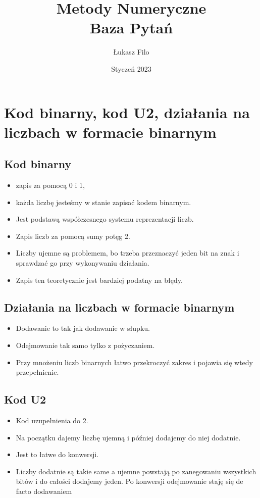 \documentclass[a4paper]{article}
\title{Metody Numeryczne \\ Baza Pytań}
\author{Łukasz Filo}
\date{Styczeń 2023}
\begin{document}
\maketitle
\renewcommand*\contentsname{Spis Treści}
\tableofcontents

\newpage

\section{Kod binarny, kod U2, działania na liczbach w formacie binarnym}

\subsection{Kod binarny}
\begin{itemize}
    \item zapis za pomocą 0 i 1,
    \item każda liczbę jesteśmy w stanie zapisać kodem binarnym.
    \item Jest podstawą współczesnego systemu reprezentacji liczb.
    \item Zapis liczb za pomocą sumy potęg 2.
    \item Liczby ujemne są problemem, bo trzeba przeznaczyć jeden bit na znak i sprawdzać go przy wykonywaniu działania.
    \item Zapis ten teoretycznie jest bardziej podatny na błędy.
\end{itemize}

\subsection{Działania na liczbach w formacie binarnym}
\begin{itemize}
    \item Dodawanie to tak jak dodawanie w słupku.
    \item Odejmowanie tak samo tylko z pożyczaniem.
    \item Przy mnożeniu liczb binarnych łatwo przekroczyć zakres i pojawia się wtedy przepełnienie.
\end{itemize}

\subsection{Kod U2}
\begin{itemize}
    \item Kod uzupełnienia do 2.
    \item Na początku dajemy liczbę ujemną i później dodajemy do niej dodatnie.
    \item Jest to łatwe do konwersji.
    \item Liczby dodatnie są takie same a ujemne powstają po zanegowaniu wszystkich bitów i do całości dodajemy jeden. Po konwersji odejmowanie staję się de facto dodawaniem
\end{itemize}
\end{document}
